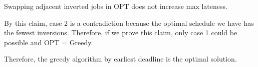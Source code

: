 \documentclass[oneside]{book}
\begin{document}
\clm {} {
    Swapping adjacent inverted jobs in OPT does not increase max lateness.
}

By this claim, case 2 is a contradiction because the optimal schedule we have has the fewest inversions. Therefore, if we prove this claim, only case 1 could be possible and OPT = Greedy.


Therefore, the greedy algorithm by earliest deadline is the optimal solution.
\end{document}
